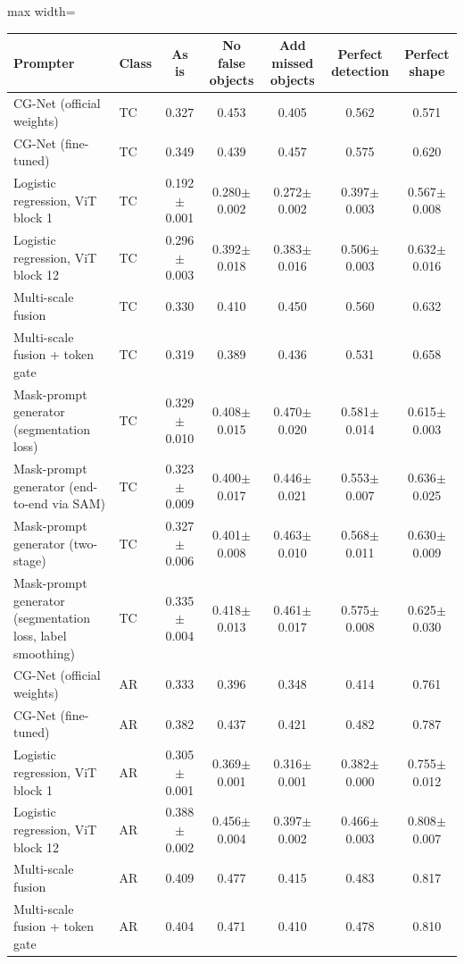 \begin{table}[htbp]
\centering
\small
\begin{adjustbox}{max width=\linewidth}
\begin{tabular}{llccccc}
\toprule
Prompter & Class & As is & No false objects & Add missed objects & Perfect detection & Perfect shape \\
\midrule
CG-Net (official weights) & TC & 0.327 & 0.453 & 0.405 & 0.562 & 0.571 \\
CG-Net (fine-tuned) & TC & 0.349 & 0.439 & 0.457 & 0.575 & 0.620 \\
Logistic regression, ViT block 1 & TC & 0.192$\pm$0.001 & 0.280$\pm$0.002 & 0.272$\pm$0.002 & 0.397$\pm$0.003 & 0.567$\pm$0.008 \\
Logistic regression, ViT block 12 & TC & 0.296$\pm$0.003 & 0.392$\pm$0.018 & 0.383$\pm$0.016 & 0.506$\pm$0.003 & 0.632$\pm$0.016 \\
Multi-scale fusion & TC & 0.330 & 0.410 & 0.450 & 0.560 & 0.632 \\
Multi-scale fusion + token gate & TC & 0.319 & 0.389 & 0.436 & 0.531 & 0.658 \\
Mask-prompt generator (segmentation loss) & TC & 0.329$\pm$0.010 & 0.408$\pm$0.015 & 0.470$\pm$0.020 & 0.581$\pm$0.014 & 0.615$\pm$0.003 \\
Mask-prompt generator (end-to-end via SAM) & TC & 0.323$\pm$0.009 & 0.400$\pm$0.017 & 0.446$\pm$0.021 & 0.553$\pm$0.007 & 0.636$\pm$0.025 \\
Mask-prompt generator (two-stage) & TC & 0.327$\pm$0.006 & 0.401$\pm$0.008 & 0.463$\pm$0.010 & 0.568$\pm$0.011 & 0.630$\pm$0.009 \\
Mask-prompt generator (segmentation loss, label smoothing) & TC & 0.335$\pm$0.004 & 0.418$\pm$0.013 & 0.461$\pm$0.017 & 0.575$\pm$0.008 & 0.625$\pm$0.030 \\
\midrule
CG-Net (official weights) & AR & 0.333 & 0.396 & 0.348 & 0.414 & 0.761 \\
CG-Net (fine-tuned) & AR & 0.382 & 0.437 & 0.421 & 0.482 & 0.787 \\
Logistic regression, ViT block 1 & AR & 0.305$\pm$0.001 & 0.369$\pm$0.001 & 0.316$\pm$0.001 & 0.382$\pm$0.000 & 0.755$\pm$0.012 \\
Logistic regression, ViT block 12 & AR & 0.388$\pm$0.002 & 0.456$\pm$0.004 & 0.397$\pm$0.002 & 0.466$\pm$0.003 & 0.808$\pm$0.007 \\
Multi-scale fusion & AR & 0.409 & 0.477 & 0.415 & 0.483 & 0.817 \\
Multi-scale fusion + token gate & AR & 0.404 & 0.471 & 0.410 & 0.478 & 0.810 \\

\end{tabular}
\end{adjustbox}
\end{table}
